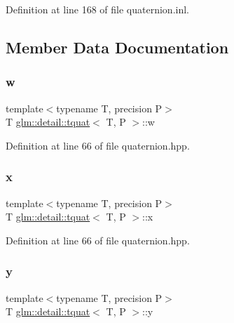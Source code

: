 Definition at line 168 of file quaternion.\+inl.



\subsection{Member Data Documentation}
\mbox{\label{structglm_1_1detail_1_1tquat_a83472ee38e4268c15ac92658e1ebfbb0}} 
\subsubsection{\texorpdfstring{w}{w}}
{\footnotesize\ttfamily template$<$typename T, precision P$>$ \\
T \hyperlink{structglm_1_1detail_1_1tquat}{glm\+::detail\+::tquat}$<$ T, P $>$\+::w}



Definition at line 66 of file quaternion.\+hpp.

\mbox{\label{structglm_1_1detail_1_1tquat_ae4db777c41ba0c7329107a4c7aa1f956}} 
\subsubsection{\texorpdfstring{x}{x}}
{\footnotesize\ttfamily template$<$typename T, precision P$>$ \\
T \hyperlink{structglm_1_1detail_1_1tquat}{glm\+::detail\+::tquat}$<$ T, P $>$\+::x}



Definition at line 66 of file quaternion.\+hpp.

\mbox{\label{structglm_1_1detail_1_1tquat_a50895e2da4e59255b25271a44ae3e43d}} 
\subsubsection{\texorpdfstring{y}{y}}
{\footnotesize\ttfamily template$<$typename T, precision P$>$ \\
T \hyperlink{structglm_1_1detail_1_1tquat}{glm\+::detail\+::tquat}$<$ T, P $>$\+::y}




